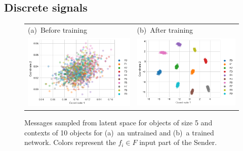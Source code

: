 \documentclass[11pt,a4paper]{article}
\begin{document}
\subsection{Discrete signals}

\begin{figure}[]
\begin{tabular}{ll}
(a)~Before training &
(b)~After training\\
\includegraphics[scale=.3, trim=15 21 50 0, clip]{./figures/messages_o5_untrained.png} &
\includegraphics[scale=.3, trim=15 21 0 0, clip]{./figures/messages_o5_shared_strict_trained.png}
\end{tabular}
\caption{Messages sampled from latent space for objects of size 5 and contexts of 10 objects for (a)~an untrained and (b)~a trained network. Colors represent the $f_i \in F$ input part of the Sender.}
 \label{fig:messages}
\end{figure}

\end{document}
